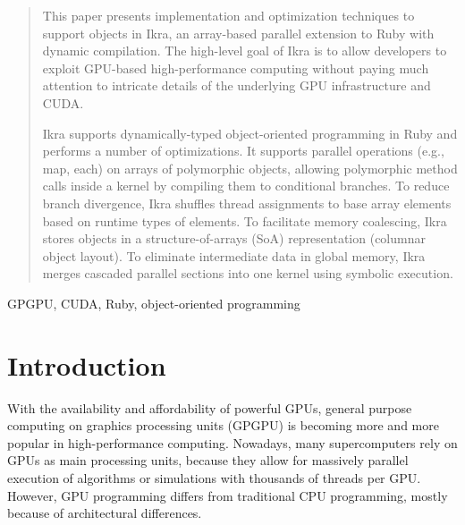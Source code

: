 \documentclass[preprint]{sigplanconf}
\begin{document}
\begin{abstract}
This paper presents implementation and optimization techniques to support objects in Ikra, an array-based parallel extension to Ruby with dynamic compilation. The high-level goal of Ikra is to allow developers to exploit GPU-based high-performance computing without paying much attention to intricate details of the underlying GPU infrastructure and CUDA.

Ikra supports dynamically-typed object-oriented programming in Ruby and performs a number of optimizations. It supports parallel operations (e.g., map, each) on arrays of polymorphic objects, allowing polymorphic method calls inside a kernel by compiling them to conditional branches. To reduce branch divergence, Ikra shuffles thread assignments to base array elements based on runtime types of elements. To facilitate memory coalescing, Ikra stores objects in a structure-of-arrays (SoA) representation (columnar object layout). To eliminate intermediate data in global memory, Ikra merges cascaded parallel sections into one kernel using symbolic execution.

\end{abstract}



\keywords
GPGPU, CUDA, Ruby, object-oriented programming

\section{Introduction}
With the availability and affordability of powerful GPUs, general purpose computing on graphics processing units (GPGPU) is becoming more and more popular in high-performance computing. Nowadays, many supercomputers rely on GPUs as main processing units, because they allow for massively parallel execution of algorithms or simulations with thousands of threads per GPU. However, GPU programming differs from traditional CPU programming, mostly because of architectural differences.
\end{document}
